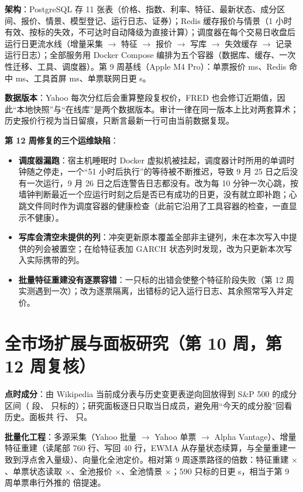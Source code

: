 \documentclass[11pt]{ctexart}
\begin{document}
\textbf{架构}：PostgreSQL 存 11 张表（价格、指数、利率、特征、最新状态、成分区间、报价、情景、模型登记、运行日志、证券）；Redis 缓存报价与情景（1 小时有效、按标的失效，不可达时自动降级为直接计算）；调度器在每个交易日收盘后运行日更流水线（增量采集 $\to$ 特征 $\to$ 报价 $\to$ 写库 $\to$ 失效缓存 $\to$ 记录运行日志）；全部服务用 Docker Compose 编排为五个容器（数据库、缓存、一次性迁移、工具、调度器）。第 9 周基线（Apple M4 Pro）：单票报价 \rnWnineQuoteMs{} ms、Redis 命中 \rnWnineRedisMs{} ms、工具首屏 \rnWnineRenderMs{} ms、单票联网日更 \rnWnineDailyS{} s。

\textbf{数据版本}：Yahoo 每次分红后会重算整段复权价，FRED 也会修订近期值，因此“本地快照”与“在线库”是两个数据版本。审计一律在同一版本上比对两套算术；历史报价行视为当日留痕，只断言最新一行可由当前数据复现。

\textbf{第 12 周修复的三个运维缺陷}：
\begin{itemize}
  \item \textbf{调度器漏跑}：宿主机睡眠时 Docker 虚拟机被挂起，调度器计时所用的单调时钟随之停走，一个“51 小时后执行”的等待被不断推迟，导致 9 月 25 日之后没有一次运行，9 月 26 日之后连警告日志都没有。改为每 10 分钟一次心跳，按墙钟判断最近一个应运行时刻之后是否已有成功的日更，没有就立即补跑；心跳文件同时作为调度容器的健康检查（此前它沿用了工具容器的检查，一直显示不健康）。
  \item \textbf{写库会清空未提供的列}：冲突更新原本覆盖全部非主键列，未在本次写入中提供的列会被置空；在给特征表加 GARCH 状态列时发现，改为只更新本次写入实际携带的列。
  \item \textbf{批量特征重建没有逐票容错}：一只标的出错会使整个特征阶段失败（第 12 周实测遇到一次）；改为逐票隔离，出错标的记入运行日志、其余照常写入并定价。
\end{itemize}

\section{全市场扩展与面板研究（第 10 周，第 12 周复核）}
\textbf{点时成分}：由 Wikipedia 当前成分表与历史变更表逆向回放得到 S\&P 500 的成分区间（\rnMemIntervals{} 段、\rnMemTickers{} 只标的）；研究面板逐日只取当日成员，避免用“今天的成分股”回看历史。面板共 \rnPanelTenRows{} 行、\rnPanelTenTickers{} 只。

\textbf{批量化工程}：多源采集（Yahoo 批量 $\to$ Yahoo 单票 $\to$ Alpha Vantage）、增量特征重建（读尾部 760 行、写回 40 行，EWMA 从存量状态续算，与全量重建一致到浮点舍入量级）、向量化全池定价。相对第 9 周逐票路径的倍数：特征重建 \rnEone$\times$、单票状态读取 \rnEtwo$\times$、全池报价 \rnEthree$\times$、全池情景 \rnEfour$\times$；590 只标的日更 \rnTenDailyS{} s，相当于第 9 周单票串行外推的 \rnEfive{} 倍提速。
\end{document}
